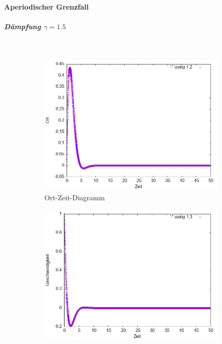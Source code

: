 \documentclass[
    oneside,
    ngerman,
    footinclude=false,
    captions=tableheading,
    DIV=12
]{scrartcl}
\begin{document}
            \paragraph{Aperiodischer Grenzfall}
                \subparagraph{Dämpfung $\gamma=1.5$}\,
                \begin{figure}[H]
                    \centering
                    \begin{subfigure}[b]{0.45\textwidth}
                        \centering
                        \includegraphics[width=\textwidth]{Bilddateien/VVA1(b)-001-1.5-x.png}
                        \caption{Ort-Zeit-Diagramm}
                        \label{fig:VVA1(a)-001-1.5-x}
                    \end{subfigure}
                    \hfill
                    \begin{subfigure}[b]{0.45\textwidth}
                        \centering
                        \includegraphics[width=\textwidth]{Bilddateien/VVA1(b)-001-1.5-v.png}

\end{subfigure}
\end{figure}
\end{document}

